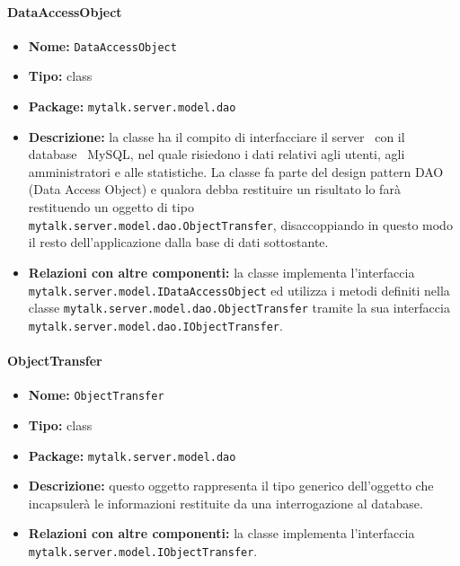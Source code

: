 \paragraph{DataAccessObject}{
	\begin{itemize}
		\item [] \textbf{Nome:} \texttt{DataAccessObject}
		\item [] \textbf{Tipo:} class
		\item [] \textbf{Package:} \texttt{mytalk.server.model.dao}
		\item [] \textbf{Descrizione:} la classe ha il compito di interfacciare il server\g~ con il database\g~ MySQL, nel quale risiedono i dati relativi agli utenti, agli amministratori e alle statistiche. La classe fa parte del design pattern DAO (Data Access Object) e qualora debba restituire un risultato lo farà restituendo un oggetto di tipo\\ \texttt{mytalk.server.model.dao.ObjectTransfer}, disaccoppiando in questo modo il resto dell'applicazione dalla base di dati sottostante.
		\item [] \textbf{Relazioni con altre componenti:} la classe implementa l'interfaccia\\ \texttt{mytalk.server.model.IDataAccessObject} ed utilizza i metodi definiti nella classe \texttt{mytalk.server.model.dao.ObjectTransfer} tramite la sua interfaccia  \texttt{mytalk.server.model.dao.IObjectTransfer}.
	\end{itemize}
}

\paragraph{ObjectTransfer}{
	\begin{itemize}
		\item [] \textbf{Nome:} \texttt{ObjectTransfer}
		\item [] \textbf{Tipo:} class
		\item [] \textbf{Package:} \texttt{mytalk.server.model.dao}
		\item [] \textbf{Descrizione:}{ questo oggetto rappresenta il tipo generico dell'oggetto che incapsulerà le informazioni restituite da una interrogazione al database.}
		\item [] \textbf{Relazioni con altre componenti:} la classe implementa l'interfaccia\\ \texttt{mytalk.server.model.IObjectTransfer}.
	\end{itemize}
}
